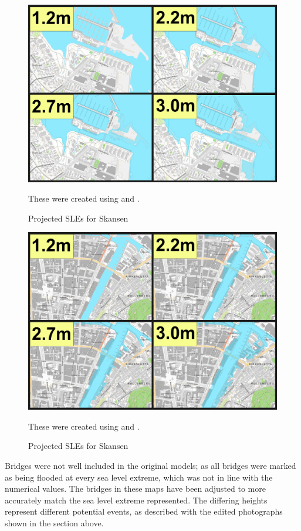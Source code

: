 \begin{figure}[H]
    \centering
    \includegraphics[width=16cm]{fig_sle/grillstad-sle-num.png}
    \caption{Projected SLEs for Skansen}{ These were created using \cite{kartverket_se_2021} and \cite{stormflo_database_stormflo_2021}. }
    \label{fig:sle_grillstad_num}
\end{figure}

\begin{figure}[H]
    \centering
    \includegraphics[width=16cm]{fig_sle/nidelva-sle-num.png}
    \caption{Projected SLEs for Skansen}{These were created using \cite{kartverket_se_2021} and \cite{stormflo_database_stormflo_2021}. }
    \label{fig:sle_nidelva_num}
\end{figure}

 Bridges were not well included in the original models; as all bridges were marked as being flooded at every sea level extreme, which was not in line with the numerical values. The bridges in these maps have been adjusted to more accurately match the sea level extreme represented. The differing heights represent different potential events,  as described with the edited photographs shown in the section above. 


